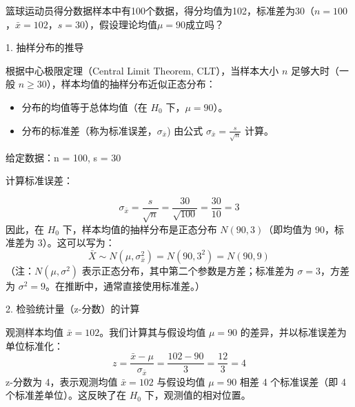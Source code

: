 \begin{example}
	篮球运动员得分数据样本中有100个数据，得分均值为102，标准差为30（$n=100$，$\bar{x}=102$，$s=30$），假设理论均值$\mu=90$成立吗？
	
\begin{flushleft}	
1. 抽样分布的推导
\end{flushleft}
根据中心极限定理（Central Limit Theorem, CLT），当样本大小 \(n\) 足够大时（一般 \(n \geq 30\)），样本均值的抽样分布近似正态分布：
\begin{itemize}
	\item 分布的均值等于总体均值（在 \(H_0\) 下，\(\mu = 90\)）。
	\item 分布的标准差（称为标准误差，\(\sigma_{\bar{x}}\)) 由公式 \(\sigma_{\bar{x}} = \frac{s}{\sqrt{n}}\) 计算。
\end{itemize}

\begin{flushleft}
给定数据：n = 100, \quad s = 30
\end{flushleft}

\begin{flushleft}
计算标准误差：
\end{flushleft}
\begin{equation}
\sigma_{\bar{x}} = \frac{s}{\sqrt{n}} = \frac{30}{\sqrt{100}} = \frac{30}{10} = 3
\end{equation}
因此，在 \(H_0\) 下，样本均值的抽样分布是正态分布 \(N(90, 3)\)（即均值为 90，标准差为 3）。这可以写为：
\begin{equation}
\bar{X} \sim N(\mu, \sigma_{\bar{x}}^2) = N(90, 3^2) = N(90, 9)
\end{equation}
（注：\(N(\mu, \sigma^2)\) 表示正态分布，其中第二个参数是方差；标准差为 \(\sigma = 3\)，方差为 \(\sigma^2 = 9\)。在推断中，通常直接使用标准差。）

\begin{flushleft}	
2. 检验统计量（z-分数）的计算
\end{flushleft}
观测样本均值 \(\bar{x} = 102\)。我们计算其与假设均值 \(\mu = 90\) 的差异，并以标准误差为单位标准化：
\begin{equation}
z = \frac{\bar{x} - \mu}{\sigma_{\bar{x}}} = \frac{102 - 90}{3} = \frac{12}{3} = 4
\end{equation}
z-分数为 4，表示观测均值 \(\bar{x} = 102\) 与假设均值 \(\mu = 90\) 相差 4 个标准误差（即 4 个标准差单位）。这反映了在 \(H_0\) 下，观测值的相对位置。


\end{example}
